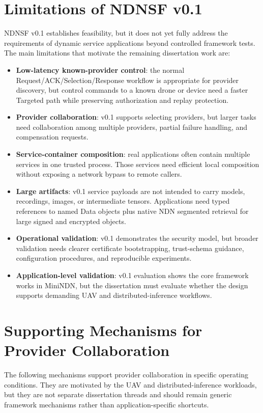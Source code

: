 \section{Limitations of NDNSF v0.1}

NDNSF v0.1 establishes feasibility, but it does not yet fully address the
requirements of dynamic service applications beyond controlled framework
tests. The main limitations
that motivate the remaining dissertation work are:

\begin{itemize}
  \item \textbf{Low-latency known-provider control}: the normal
  Request/ACK/Selection/Response workflow is appropriate for provider
  discovery, but control commands to a known drone or device need a faster
  Targeted path while preserving authorization and replay protection.
  \item \textbf{Provider collaboration}: v0.1 supports selecting providers, but
  larger tasks need collaboration among multiple providers, partial failure
  handling, and compensation requests.
  \item \textbf{Service-container composition}: real applications often contain
  multiple services in one trusted process. Those services need efficient local
  composition without exposing a network bypass to remote callers.
  \item \textbf{Large artifacts}: v0.1 service payloads are not intended to
  carry models, recordings, images, or intermediate tensors. Applications need
  typed references to named Data objects plus native NDN segmented retrieval
  for large signed and encrypted objects.
  \item \textbf{Operational validation}: v0.1 demonstrates the security
  model, but broader validation needs clearer certificate bootstrapping,
  trust-schema guidance, configuration procedures, and reproducible
  experiments.
  \item \textbf{Application-level validation}: v0.1 evaluation shows the core
  framework works in MiniNDN, but the dissertation must evaluate whether the
  design supports demanding UAV and distributed-inference workflows.
\end{itemize}

\section{Supporting Mechanisms for Provider Collaboration}

The following mechanisms support provider collaboration in specific operating
conditions. They are motivated by the UAV and distributed-inference workloads,
but they are not separate dissertation threads and should remain generic
framework mechanisms rather than application-specific shortcuts.

